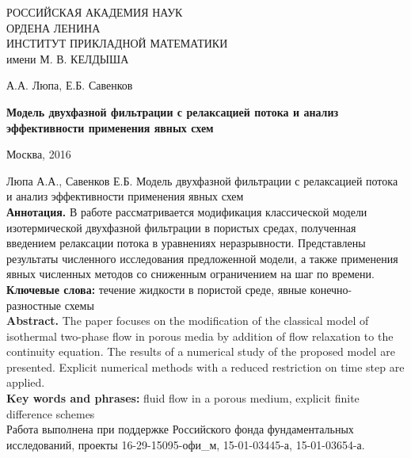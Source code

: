 \begin{titlepage}
\begin{center}

{РОССИЙСКАЯ АКАДЕМИЯ НАУК \\
ОРДЕНА ЛЕНИНА \\
ИНСТИТУТ ПРИКЛАДНОЙ МАТЕМАТИКИ \\
имени М. В. КЕЛДЫША \\
\par}

\vspace{80mm}

{А.А. Люпа, Е.Б. Савенков\par}

\vspace{10mm}

{\bf \large Модель двухфазной фильтрации с релаксацией потока
и анализ эффективности применения явных схем
\par}

\end{center}

\vspace{\fill}

\begin{center}
{Москва, 2016}
\end{center}

\clearpage
\end{titlepage}
\newpage


Люпа А.А., Савенков Е.Б. Модель двухфазной фильтрации с релаксацией потока
и анализ эффективности применения явных схем
\\

{\bf Аннотация.} В работе рассматривается модификация классической модели
изотермической двухфазной фильтрации в пористых средах, полученная 
введением релаксации потока в уравнениях неразрывности.
Представлены результаты численного исследования предложенной модели,
а также применения явных численных методов со сниженным ограничением на
шаг по времени.
\\

{\bf Ключевые слова:} течение жидкости в пористой среде, явные конечно-разностные схемы
\\

{\bf Abstract.} The paper focuses on the modification of the classical model of isothermal two-phase 
flow in porous media by addition of flow relaxation to the continuity equation. 
The results of a numerical study of the proposed model are presented. 
Explicit numerical methods with a reduced restriction on time step are applied.
\\

{\bf Key words and phrases:} fluid flow in a porous medium, explicit finite difference schemes
\\

Работа выполнена при поддержке Российского фонда фундаментальных исследований, проекты 16-29-15095-офи\_м, 15-01-03445-а, 15-01-03654-а.